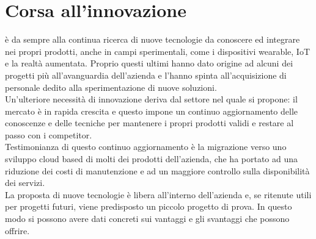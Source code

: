 \section{Corsa all'innovazione}
\nomeAzienda{} è da sempre alla continua ricerca di nuove tecnologie da conoscere ed integrare nei propri prodotti, anche in campi sperimentali, come i dispositivi \gls{wearable}, \gls{IoT} e la realtà aumentata. Proprio questi ultimi hanno dato origine ad alcuni dei progetti più all'avanguardia dell'azienda e l'hanno spinta all'acquisizione di personale dedito alla sperimentazione di nuove soluzioni.
\\
Un'ulteriore necessità di innovazione deriva dal settore nel quale \nomeAzienda{} si propone: il mercato è in rapida crescita e questo impone un continuo aggiornamento delle conoscenze e delle tecniche per mantenere i propri prodotti validi e restare al passo con i competitor.
\\
Testimonianza di questo continuo aggiornamento è la migrazione verso uno sviluppo cloud based di molti dei prodotti dell'azienda, che ha portato ad una riduzione dei costi di manutenzione e ad un maggiore controllo sulla disponibilità dei servizi.
\\
La proposta di nuove tecnologie è libera all'interno dell'azienda e, se ritenute utili per progetti futuri, viene predisposto un piccolo progetto di prova. In questo modo si possono avere dati concreti sui vantaggi e gli svantaggi che possono offrire.
